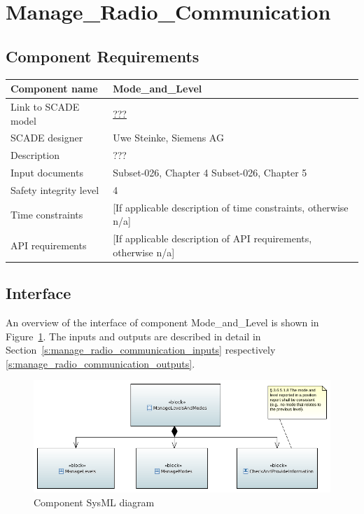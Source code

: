 
\section{Manage\_Radio\_Communication}

\subsection{Component Requirements}

\begin{longtable}{p{}p{}}
\toprule
Component name			& Mode\_and\_Level \\
\midrule
Link to SCADE model		& {\footnotesize \url{???}} \\
\midrule
SCADE designer			& Uwe Steinke, Siemens AG \\
\midrule
Description				& ??? \\
\midrule
Input documents	& 
Subset-026, Chapter 4 \newline
Subset-026, Chapter 5 \\
\midrule
Safety integrity level	& 4 \\
\midrule
Time constraints		& [If applicable description of time constraints, otherwise n/a] \\
\midrule
API requirements 		& [If applicable description of API requirements, otherwise n/a] \\
\bottomrule
\end{longtable}


\subsection{Interface}

An overview of the interface of component Mode\_and\_Level is shown in Figure~\ref{f:manage_radio_communication_interface}. The inputs and outputs are described in detail in Section~\ref{s:manage_radio_communication_inputs} respectively \ref{s:manage_radio_communication_outputs}.

\begin{figure}
\center
\includegraphics[width=\textwidth]{images/FunctionalArchitecture.png}
\caption{Component SysML diagram}\label{f:manage_radio_communication_interface}
\end{figure}


